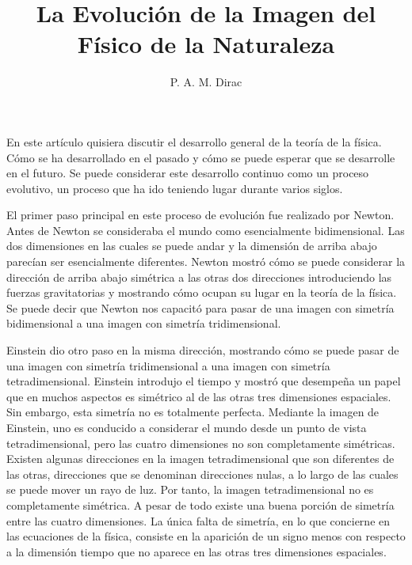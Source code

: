 \documentclass[a4paper, 12pt]{article}
\title{La Evolución de la Imagen del Físico de la Naturaleza}
\author{P. A. M. Dirac}
\date{}
\begin{document}
\begin{tcolorbox}[colback=blue!5!white,colframe=blue!75!black]

\vspace{-1.8cm}
\textbf \maketitle

\end{tcolorbox}

\bigskip

 En este artículo quisiera discutir el desarrollo general de la teoría de la física. Cómo se ha desarrollado en el pasado y cómo se puede esperar que se desarrolle en el futuro. Se puede considerar este desarrollo continuo como un proceso evolutivo, un proceso que ha ido teniendo lugar durante varios siglos.

El primer paso principal en este proceso de evolución fue realizado por Newton. Antes de Newton se consideraba el mundo como esencialmente bidimensional. Las dos dimensiones en las cuales se puede andar y la dimensión de arriba abajo parecían ser esencialmente diferentes. Newton mostró cómo se puede considerar la dirección de arriba abajo simétrica a las otras dos direcciones introduciendo las fuerzas gravitatorias y mostrando cómo ocupan su lugar en la teoría de la física. Se puede decir que Newton nos capacitó para pasar de una imagen con simetría bidimensional a una imagen con simetría tridimensional.

Einstein dio otro paso en la misma dirección, mostrando cómo se puede pasar de una imagen con simetría tridimensional a una imagen con simetría tetradimensional. Einstein introdujo el tiempo y mostró que desempeña un papel que en muchos aspectos es simétrico al de las otras tres dimensiones espaciales. Sin embargo, esta simetría no es totalmente perfecta. Mediante la imagen de Einstein, uno es conducido a considerar el mundo desde un punto de vista tetradimensional, pero las cuatro dimensiones no son completamente simétricas. Existen algunas direcciones en la imagen tetradimensional que son diferentes de las otras, direcciones que se denominan direcciones nulas, a lo largo de las cuales se puede mover un rayo de luz. Por tanto, la imagen tetradimensional no es completamente simétrica. A pesar de todo existe una buena porción de simetría entre las cuatro dimensiones. La única falta de simetría, en lo que concierne en las ecuaciones de la física, consiste en la aparición de un signo menos con respecto a la dimensión tiempo que no aparece en las otras tres dimensiones espaciales.
\end{document}
